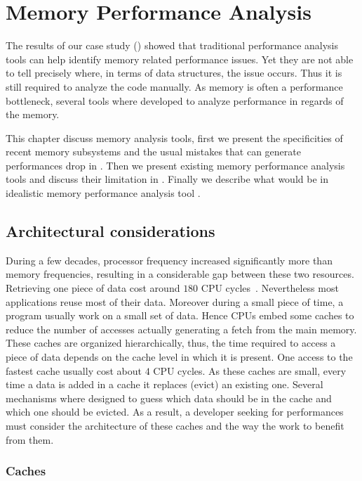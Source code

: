 \chapter{Memory Performance Analysis}
\label{chap:mem}

The results of our case study () showed that traditional performance analysis tools can help identify memory related performance issues.
Yet they are not able to tell precisely where, in terms of data structures, the issue occurs.
Thus it is still required to analyze the code manually.
As memory is often a performance bottleneck, several tools where developed to analyze performance in regards of the memory.

This chapter discuss memory analysis tools, first we present the specificities of recent memory subsystems and the usual mistakes that can generate performances drop in .
Then we present existing memory performance analysis tools and discuss their limitation in .
Finally we describe what would be in idealistic memory performance analysis tool .

\section{Architectural considerations}
\label{sec:archi}

During a few decades, processor frequency increased significantly more than memory frequencies, resulting in a considerable gap between these two resources.
Retrieving one piece of data cost around $180$ \gls{CPU} cycles~\cite{Levinthal09Performance}.
Nevertheless most applications reuse most of their data.
Moreover during a small piece of time, a program usually work on a small set of data.
Hence \glspl{CPU} embed some caches to reduce the number of accesses actually generating a fetch from the main memory.
These caches are organized hierarchically, thus, the time required to access a piece of data depends on the cache level in which it is present.
One access to the fastest cache usually cost about $4$ \gls{CPU} cycles.
As these caches are small, every time a data is added in a cache it replaces (evict) an existing one.
Several mechanisms where designed to guess which data should be in the cache and which one should be evicted.
As a result, a developer seeking for performances must consider the architecture of these caches and the way the work to benefit from them.

\subsection{Caches}

